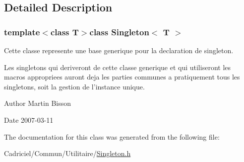 \subsection{Detailed Description}
\subsubsection*{template$<$class T$>$class Singleton$<$ T $>$}

Cette classe represente une base generique pour la declaration de singleton. 

Les singletons qui deriveront de cette classe generique et qui utiliseront les macros appropriees auront deja les parties communes a pratiquement tous les singletons, soit la gestion de l'instance unique.

\begin{DoxyAuthor}{Author}
Martin Bisson 
\end{DoxyAuthor}
\begin{DoxyDate}{Date}
2007-\/03-\/11 
\end{DoxyDate}


The documentation for this class was generated from the following file\-:\begin{DoxyCompactItemize}
\item 
Cadriciel/\-Commun/\-Utilitaire/\hyperlink{_singleton_8h}{Singleton.\-h}\end{DoxyCompactItemize}
